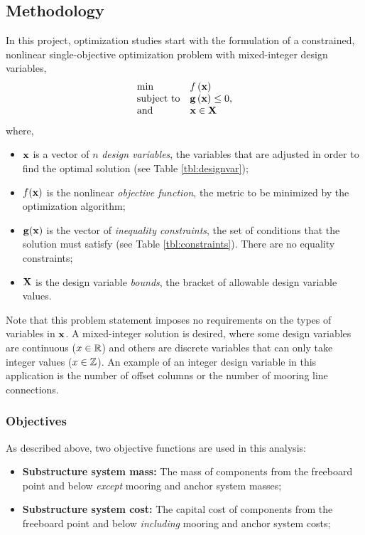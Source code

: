 \subsection{Methodology}
In this project, optimization studies start with the formulation of
a constrained, nonlinear single-objective optimization problem with
mixed-integer design variables,
\begin{equation}
\begin{array}{ll}
  \min & f\left(\mathbf{x}\right)\\
  \text{subject to} & \mathbf{g}\left(\mathbf{x}\right) \leq 0,\\
  \text{and}& \mathbf{x} \in \mathbf{X} \\
  \end{array}
\end{equation}
where,
\begin{itemize}
\item $\mathbf{x}$ is a vector of $n$ \textit{design variables}, the variables that are adjusted in order to
  find the optimal solution (see Table \ref{tbl:designvar});
\item $f(\mathbf{x})$ is the nonlinear \textit{objective function}, the
  metric to be minimized by the optimization algorithm;
\item $\mathbf{g} (\mathbf{x})$ is the vector of \textit{inequality constraints}, the
  set of conditions that the solution must satisfy (see Table
  \ref{tbl:constraints}).  There are no equality constraints;
\item $\mathbf{X}$ is the design variable \textit{bounds}, the bracket of
  allowable design variable values.
\end{itemize}

Note that this problem statement imposes no requirements on the types of
variables in $\mathbf{x}$.  A mixed-integer solution is desired, where some
design variables are continuous ($x \in \mathbb{R}$) and others are
discrete variables that can only take integer values ($x \in
\mathbb{Z}$).  An example of an integer design variable in this
application is the number of offset columns or the number of mooring
line connections.


\subsubsection{Objectives}
As described above, two objective functions are used in this analysis:
\begin{itemize}
\item \textbf{Substructure system mass:} The mass of components from the
  freeboard point and below \textit{except} mooring and anchor system masses;
\item \textbf{Substructure system cost:} The capital cost of components from the
  freeboard point and below \textit{including} mooring and anchor system costs;
\end{itemize}


